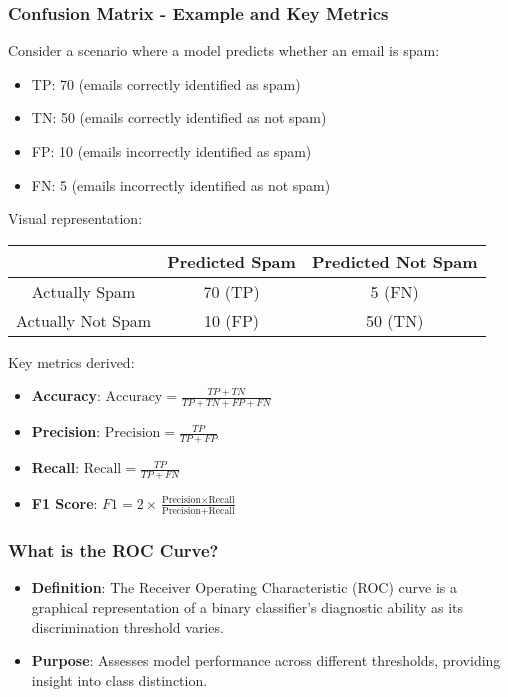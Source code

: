 \documentclass[aspectratio=169]{beamer}
\begin{document}
\begin{frame}[fragile]
    \frametitle{Confusion Matrix - Example and Key Metrics}
    Consider a scenario where a model predicts whether an email is spam:
    \begin{itemize}
        \item TP: 70 (emails correctly identified as spam)
        \item TN: 50 (emails correctly identified as not spam)
        \item FP: 10 (emails incorrectly identified as spam)
        \item FN: 5 (emails incorrectly identified as not spam)
    \end{itemize}
    Visual representation:
    \begin{center}
    \begin{tabular}{|c|c|c|}
        \hline
        & Predicted Spam & Predicted Not Spam \\
        \hline
        Actually Spam & 70 (TP) & 5 (FN) \\
        \hline
        Actually Not Spam & 10 (FP) & 50 (TN) \\
        \hline
    \end{tabular}
    \end{center}
    Key metrics derived:
    \begin{itemize}
        \item \textbf{Accuracy}: $\text{Accuracy} = \frac{TP + TN}{TP + TN + FP + FN}$
        \item \textbf{Precision}: $\text{Precision} = \frac{TP}{TP + FP}$
        \item \textbf{Recall}: $\text{Recall} = \frac{TP}{TP + FN}$
        \item \textbf{F1 Score}: $F1 = 2 \times \frac{\text{Precision} \times \text{Recall}}{\text{Precision} + \text{Recall}}$
    \end{itemize}
\end{frame}

\begin{frame}[fragile]
    \frametitle{What is the ROC Curve?}
    \begin{itemize}
        \item \textbf{Definition}: The Receiver Operating Characteristic (ROC) curve is a graphical representation of a binary classifier's diagnostic ability as its discrimination threshold varies.
        \item \textbf{Purpose}: Assesses model performance across different thresholds, providing insight into class distinction.
    \end{itemize}
\end{frame}
\end{document}
